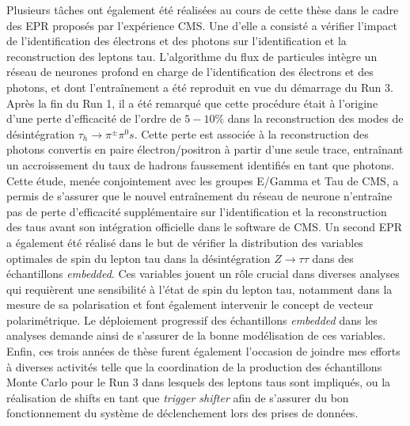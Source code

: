 Plusieurs tâches ont également été réalisées au cours de cette thèse dans le cadre des EPR proposés par l'expérience CMS. Une d'elle a consisté a vérifier l'impact de l'identification des électrons et des photons sur l'identification et la reconstruction des leptons tau. L'algorithme du flux de particules intègre un réseau de neurones profond en charge de l'identification des électrons et des photons, et dont l'entraînement a été reproduit en vue du démarrage du Run 3. Après la fin du Run 1, il a été remarqué que cette procédure était à l'origine d'une perte d'efficacité de l'ordre de $5-10\%$ dans la reconstruction des modes de désintégration $\tau_h\to\pi^{\pm}\pi^0s$. Cette perte est associée à la reconstruction des photons convertis en paire électron/positron à partir d'une seule trace, entraînant un accroissement du taux de hadrons faussement identifiés en tant que photons. Cette étude, menée conjointement avec les groupes E/Gamma et Tau de CMS, a permis de s'assurer que le nouvel entraînement du réseau de neurone n'entraîne pas de perte d'efficacité supplémentaire sur l'identification et la reconstruction des taus avant son intégration officielle dans le software de CMS. Un second EPR a également été réalisé dans le but de vérifier la distribution des variables optimales de spin du lepton tau dans la désintégration $Z\to\tau\tau$ dans des échantillons \textit{embedded}. Ces variables jouent un rôle crucial dans diverses analyses qui requièrent une sensibilité à l'état de spin du lepton tau, notamment dans la mesure de sa polarisation \cite{Zpol} et font également intervenir le concept de vecteur polarimétrique. Le déploiement progressif des échantillons \textit{embedded} dans les analyses demande ainsi de s'assurer de la bonne modélisation de ces variables. Enfin, ces trois années de thèse furent également l'occasion de joindre mes efforts à diverses activités telle que la coordination de la production des échantillons Monte Carlo pour le Run 3 dans lesquels des leptons taus sont impliqués, ou la réalisation de shifts en tant que \textit{trigger shifter} afin de s'assurer du bon fonctionnement du système de déclenchement lors des prises de données.